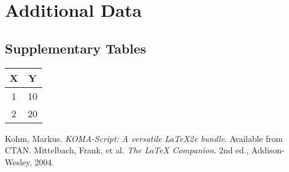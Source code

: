 \documentclass[
  a4paper,            %
  11pt,               %
  DIV=12,             %
  BCOR=5mm,           %
  twoside,            %
  headings=normal,    %
  toc=bibliography,   %
  toc=listof,         %
  listof=totoc,       %
  parskip=half,       %
  captions=tableheading, %
  numbers=autoendperiod, %
  appendixprefix=true,%
  chapterprefix=true, %
]{scrreprt}
\begin{document}

\appendix
\chapter{Additional Data}
\section{Supplementary Tables}
\lipsum[17]
\begin{table}[hbtp]
  \centering
  \begin{tabular}{cc}
    \toprule
    X & Y  \\
    \midrule
    1 & 10 \\
    2 & 20 \\
    \bottomrule
  \end{tabular}
\end{table}

\clearpage %
\begin{thebibliography}{9}
   Kohm, Markus. \textit{KOMA-Script: A versatile LaTeX2e bundle}. Available from CTAN\@.
   Mittelbach, Frank, et al. \textit{The LaTeX Companion}. 2nd ed., Addison-Wesley, 2004.
\end{thebibliography}

\clearpage
\printindex
\end{document}
